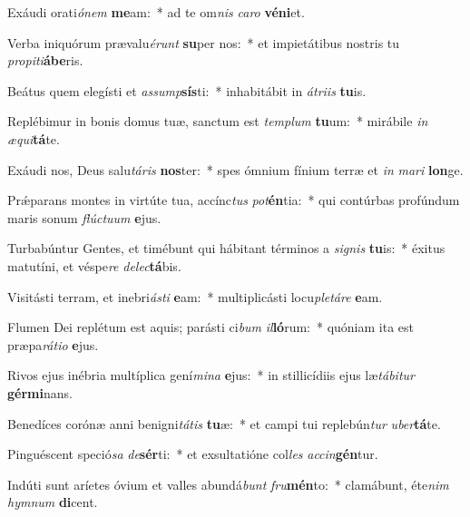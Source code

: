 \item Exáudi orati\textit{ó}\textit{nem} \textbf{me}am:~* ad te om\textit{nis} \textit{ca}\textit{ro} \textbf{vé}\textbf{ni}et.
\item Verba iniquórum prævalu\textit{é}\textit{runt} \textbf{su}per nos:~* et impietátibus nostris tu \textit{pro}\textit{pi}\textit{ti}\textbf{á}\textbf{be}ris.
\item Beátus quem elegísti et \textit{as}\textit{sump}\textbf{sís}ti:~* inhabitábit in \textit{á}\textit{tri}\textit{is} \textbf{tu}is.
\item Replébimur in bonis domus tuæ, sanctum est \textit{tem}\textit{plum} \textbf{tu}um:~* mirábile \textit{in} \textit{æ}\textit{qui}\textbf{tá}te.
\item Exáudi nos, Deus salu\textit{tá}\textit{ris} \textbf{nos}ter:~* spes ómnium fínium terræ et \textit{in} \textit{ma}\textit{ri} \textbf{lon}ge.
\item Prǽparans montes in virtúte tua, accínc\textit{tus} \textit{pot}\textbf{én}tia:~* qui contúrbas profúndum maris sonum \textit{flúc}\textit{tu}\textit{um} \textbf{e}jus.
\item Turbabúntur Gentes, et timébunt qui hábitant términos a \textit{si}\textit{gnis} \textbf{tu}is:~* éxitus matutíni, et véspe\textit{re} \textit{de}\textit{lec}\textbf{tá}bis.
\item Visitásti terram, et inebri\textit{ás}\textit{ti} \textbf{e}am:~* multiplicásti locu\textit{ple}\textit{tá}\textit{re} \textbf{e}am.
\item Flumen Dei replétum est aquis; parásti ci\textit{bum} \textit{il}\textbf{ló}rum:~* quóniam ita est præpa\textit{rá}\textit{ti}\textit{o} \textbf{e}jus.
\item Rivos ejus inébria multíplica gení\textit{mi}\textit{na} \textbf{e}jus:~* in stillicídiis ejus læ\textit{tá}\textit{bi}\textit{tur} \textbf{gér}\textbf{mi}nans.
\item Benedíces corónæ anni benigni\textit{tá}\textit{tis} \textbf{tu}æ:~* et campi tui replebún\textit{tur} \textit{u}\textit{ber}\textbf{tá}te.
\item Pinguéscent speció\textit{sa} \textit{de}\textbf{sér}ti:~* et exsultatióne col\textit{les} \textit{ac}\textit{cin}\textbf{gén}tur.
\item Indúti sunt aríetes óvium et valles abundá\textit{bunt} \textit{fru}\textbf{mén}to:~* clamábunt, éte\textit{nim} \textit{hym}\textit{num} \textbf{di}cent.
